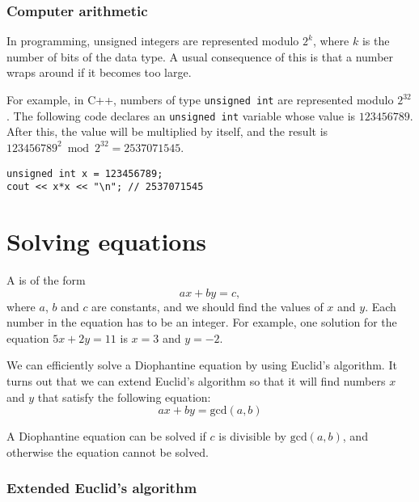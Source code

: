 \subsubsection{Computer arithmetic}

In programming, unsigned integers are represented modulo $2^k$,
where $k$ is the number of bits of the data type.
A usual consequence of this is that a number wraps around
if it becomes too large.

For example, in C++, numbers of type \texttt{unsigned int}
are represented modulo $2^{32}$.
The following code declares an \texttt{unsigned int}
variable whose value is $123456789$.
After this, the value will be multiplied by itself,
and the result is
$123456789^2 \bmod 2^{32} = 2537071545$.

\begin{lstlisting}
unsigned int x = 123456789;
cout << x*x << "\n"; // 2537071545
\end{lstlisting}

\section{Solving equations}


A  is of the form
\[ ax + by = c, \]
where $a$, $b$ and $c$ are constants,
and we should find the values of $x$ and $y$.
Each number in the equation has to be an integer.
For example, one solution for the equation
$5x+2y=11$ is $x=3$ and $y=-2$.


We can efficiently solve a Diophantine equation
by using Euclid's algorithm.
It turns out that we can extend Euclid's algorithm
so that it will find numbers $x$ and $y$
that satisfy the following equation:
\[
ax + by = \textrm{gcd}(a,b)
\]

A Diophantine equation can be solved if
$c$ is divisible by
$\textrm{gcd}(a,b)$,
and otherwise the equation cannot be solved.


\subsubsection*{Extended Euclid's algorithm}


